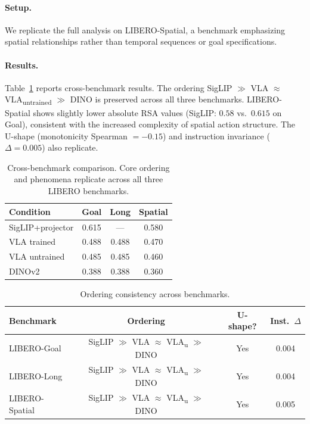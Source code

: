 \documentclass[letterpaper]{article}
\begin{document}
\paragraph{Setup.}
We replicate the full analysis on LIBERO-Spatial, a benchmark emphasizing spatial relationships rather than temporal sequences or goal specifications.

\paragraph{Results.}
Table~\ref{tab:cross_benchmark} reports cross-benchmark results.
The ordering SigLIP $\gg$ VLA $\approx$ VLA\textsubscript{untrained} $\gg$ DINO is preserved across all three benchmarks.
LIBERO-Spatial shows slightly lower absolute RSA values (SigLIP: $0.58$ vs.\ $0.615$ on Goal), consistent with the increased complexity of spatial action structure.
The U-shape (monotonicity Spearman $=-0.15$) and instruction invariance ($\Delta=0.005$) also replicate.

\begin{table}[t]
\centering
\caption{Cross-benchmark comparison. Core ordering and phenomena replicate across all three LIBERO benchmarks.}
\label{tab:cross_benchmark}
\small
\begin{tabular}{lccc}
\toprule
\textbf{Condition} & \textbf{Goal} & \textbf{Long} & \textbf{Spatial} \\
\midrule
SigLIP+projector & 0.615 & --- & 0.580 \\
VLA trained & 0.488 & 0.488 & 0.470 \\
VLA untrained & 0.485 & 0.485 & 0.460 \\
DINOv2 & 0.388 & 0.388 & 0.360 \\
\bottomrule
\end{tabular}
\end{table}

\begin{table}[t]
\centering
\caption{Ordering consistency across benchmarks.}
\label{tab:ordering_consistency}
\small
\begin{tabular}{lccc}
\toprule
\textbf{Benchmark} & \textbf{Ordering} & \textbf{U-shape?} & \textbf{Inst.\ $\Delta$} \\
\midrule
LIBERO-Goal & SigLIP $\gg$ VLA $\approx$ VLA\textsubscript{u} $\gg$ DINO & Yes & 0.004 \\
LIBERO-Long & SigLIP $\gg$ VLA $\approx$ VLA\textsubscript{u} $\gg$ DINO & Yes & 0.004 \\
LIBERO-Spatial & SigLIP $\gg$ VLA $\approx$ VLA\textsubscript{u} $\gg$ DINO & Yes & 0.005 \\
\bottomrule
\end{tabular}
\end{table}
\end{document}
